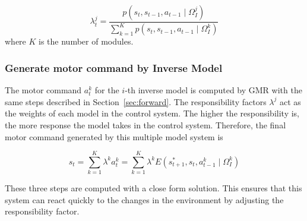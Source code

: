 \begin{equation}
\lambda^j_t = \frac{p(s_t,s_{t-1},a_{t-1}\mid \Omega_I^j)}{\sum_{k=1}^{K}{p(s_t,s_{t-1},a_{t-1}\mid \Omega_I^k)}}
\end{equation}
where $K$ is the number of modules.


\subsubsection{Generate motor command by Inverse Model}
\label{sec:inverse}

The motor command $a^k_t$ for the $i$-th inverse model is computed by GMR with the same steps  described in Section~\ref{sec:forward}. The responsibility factors $\lambda^j$ act as the weights of each model in the control system. The higher the responsibility is, the more response the model takes in the control system. Therefore, the final motor command generated by this multiple model system is

\begin{equation}
\label{e_mix}
s_t = \sum_{k=1}^K{\lambda^k a_t^k} = \sum_{k=1}^K{\lambda^k E\left({s^*_{t+1},s_t, a^k_{t-1} \mid \Omega^k_I}\right)}
\end{equation}

These three steps are computed with a close form solution. This ensures that this system can react quickly to the changes in the environment by adjusting the responsibility factor.



